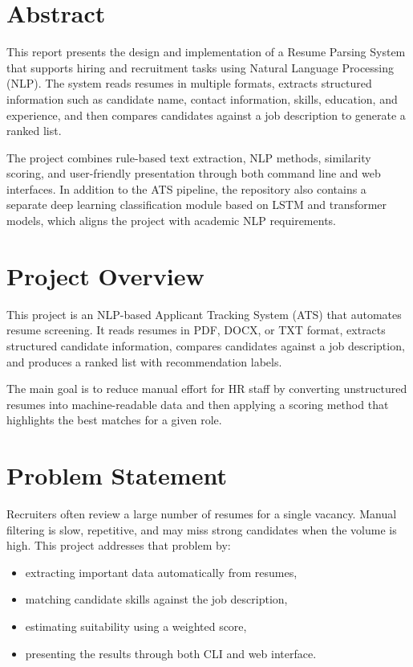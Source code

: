 \documentclass[12pt,a4paper]{article}
\begin{document}
\tableofcontents
\newpage

\section{Abstract}
This report presents the design and implementation of a Resume Parsing System that supports hiring and recruitment tasks using Natural Language Processing (NLP). The system reads resumes in multiple formats, extracts structured information such as candidate name, contact information, skills, education, and experience, and then compares candidates against a job description to generate a ranked list.

The project combines rule-based text extraction, NLP methods, similarity scoring, and user-friendly presentation through both command line and web interfaces. In addition to the ATS pipeline, the repository also contains a separate deep learning classification module based on LSTM and transformer models, which aligns the project with academic NLP requirements.

\section{Project Overview}
This project is an NLP-based Applicant Tracking System (ATS) that automates resume screening. It reads resumes in PDF, DOCX, or TXT format, extracts structured candidate information, compares candidates against a job description, and produces a ranked list with recommendation labels.

The main goal is to reduce manual effort for HR staff by converting unstructured resumes into machine-readable data and then applying a scoring method that highlights the best matches for a given role.

\section{Problem Statement}
Recruiters often review a large number of resumes for a single vacancy. Manual filtering is slow, repetitive, and may miss strong candidates when the volume is high. This project addresses that problem by:

\begin{itemize}[leftmargin=1.5em]
    \item extracting important data automatically from resumes,
    \item matching candidate skills against the job description,
    \item estimating suitability using a weighted score,
    \item presenting the results through both CLI and web interface.
\end{itemize}
\end{document}
